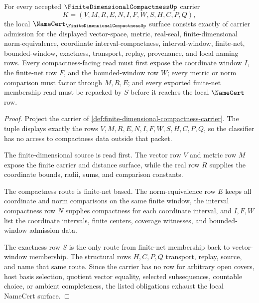\begin{theorem}
\label{thm:finite-dimensional-compactness-namecert-obligations}
For every accepted $\FiniteDimensionalCompactnessUp$ carrier
$$
K=(V,M,R,E,N,I,F,W,S,H,C,P,Q),
$$
the local $\NameCert_{\FiniteDimensionalCompactnessUp}$ surface consists exactly of carrier admission for the displayed vector-space, metric, real-seal, finite-dimensional norm-equivalence, coordinate interval-compactness, interval-window, finite-net, bounded-window, exactness, transport, replay, provenance, and local naming rows. Every compactness-facing read must first expose the coordinate window $I$, the finite-net row $F$, and the bounded-window row $W$; every metric or norm comparison must factor through $M,R,E$; and every exported finite-net membership read must be repacked by $S$ before it reaches the local $\NameCert$ row.
\end{theorem}
\begin{proof}
Project the carrier of \autoref{def:finite-dimensional-compactness-carrier}. The tuple displays exactly the rows $V,M,R,E,N,I,F,W,S,H,C,P,Q$, so the classifier has no access to compactness data outside that packet.

The finite-dimensional source is read first. The vector row $V$ and metric row $M$ expose the finite carrier and distance surface, while the real row $R$ supplies the coordinate bounds, radii, sums, and comparison constants.

The compactness route is finite-net based. The norm-equivalence row $E$ keeps all coordinate and norm comparisons on the same finite window, the interval compactness row $N$ supplies compactness for each coordinate interval, and $I,F,W$ list the coordinate intervals, finite centers, coverage witnesses, and bounded-window admission data.

The exactness row $S$ is the only route from finite-net membership back to vector-window membership. The structural rows $H,C,P,Q$ transport, replay, source, and name that same route. Since the carrier has no row for arbitrary open covers, host basis selection, quotient vector equality, selected subsequences, countable choice, or ambient completeness, the listed obligations exhaust the local NameCert surface.
\end{proof}

